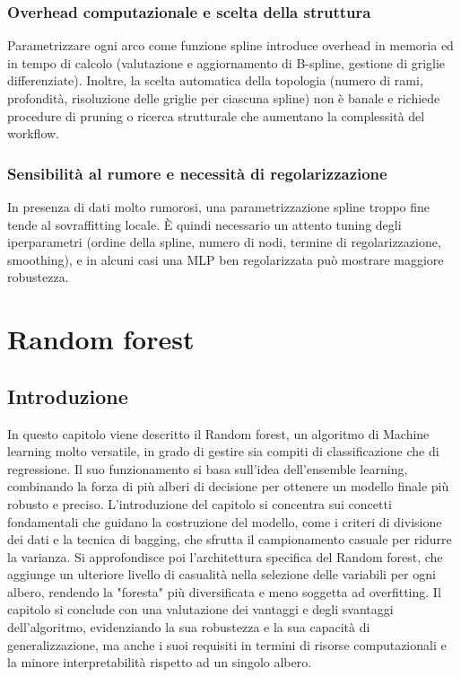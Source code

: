\documentclass[a4paper,12pt]{report}
\begin{document}
	\subsection{Overhead computazionale e scelta della struttura}
	Parametrizzare ogni arco come funzione spline introduce overhead in memoria ed in tempo di calcolo (valutazione e aggiornamento di B-spline, gestione di griglie differenziate). Inoltre, la scelta automatica della topologia (numero di rami, profondità, risoluzione delle griglie per ciascuna spline) non è banale e richiede procedure di pruning o ricerca strutturale che aumentano la complessità del workflow.
	
	\subsection{Sensibilità al rumore e necessità di regolarizzazione}
	In presenza di dati molto rumorosi, una parametrizzazione spline troppo fine tende al sovraffitting locale. È quindi necessario un attento tuning degli iperparametri (ordine della spline, numero di nodi, termine di regolarizzazione, smoothing), e in alcuni casi una MLP ben regolarizzata può mostrare maggiore robustezza.
	
	\chapter{Random forest}
	
	\section{Introduzione}
	In questo capitolo viene descritto il Random forest, un algoritmo di Machine learning molto versatile, in grado di gestire sia compiti di classificazione che di regressione. Il suo funzionamento si basa sull'idea dell'ensemble learning, combinando la forza di più alberi di decisione per ottenere un modello finale più robusto e preciso. L'introduzione del capitolo si concentra sui concetti fondamentali che guidano la costruzione del modello, come i criteri di divisione dei dati e la tecnica di bagging, che sfrutta il campionamento casuale per ridurre la varianza. Si approfondisce poi l'architettura specifica del Random forest, che aggiunge un ulteriore livello di casualità nella selezione delle variabili per ogni albero, rendendo la "foresta" più diversificata e meno soggetta ad overfitting. Il capitolo si conclude con una valutazione dei vantaggi e degli svantaggi dell'algoritmo, evidenziando la sua robustezza e la sua capacità di generalizzazione, ma anche i suoi requisiti in termini di risorse computazionali e la minore interpretabilità rispetto ad un singolo albero.
	
\end{document}
